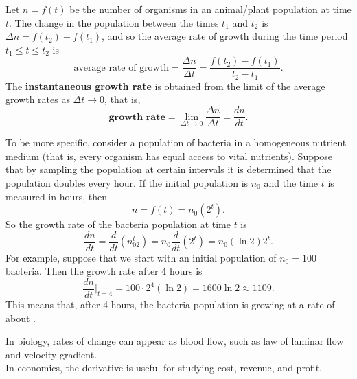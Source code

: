 \documentclass{book}
\begin{document}
\begin{Exam}\label{exam:bacteriagrowth} Let $n = f(t)$ be the number of organisms in an animal/plant population at time $t$. The change in the population between the times $t_1$ and $t_2$ is $\Delta n = f(t_2) - f(t_1)$, and so the average rate of growth during the time period $t_1\le t\le t_2$ is \[\text{average rate of growth} = \dfrac{\Delta n}{\Delta t} = \dfrac{f(t_2) -f(t_1)}{t_2-t_1}.\] The \textbf{instantaneous growth rate} is obtained from the limit of the average growth rates as $\Delta t \to 0$, that is, 
\[\textbf{growth rate} = \lim_{\Delta t \to 0}\dfrac{\Delta n}{\Delta t} = \dfrac{dn}{dt}.\]\vs

To be more specific, consider a population of bacteria in a homogeneous nutrient medium (that is, every organism has equal access to vital nutrients). Suppose that by sampling the population at certain intervals it is determined that the population doubles every hour. If the initial population is $n_0$ and the time $t$ is measured in hours, then \[n = f(t) = n_0(2^t).\] So the growth rate of the bacteria population at time $t$ is 
\[\dfrac{dn}{dt} = \dfrac{d}{dt}(n_02^t) = n_0\dfrac{d}{dt}(2^t) = n_0(\ln 2)2^t.\] For example, suppose that we start with an initial population of $n_0 = 100$ bacteria. Then the growth rate after 4 hours is \[\dfrac{dn}{dt}\bigg\vert_{t=4} = 100\cdot 2^4(\ln 2) = 1600\ln 2 \approx 1109.\] This means that, after 4 hours, the bacteria population is growing at a rate of about . 
\end{Exam}\vs

In biology, rates of change can appear as blood flow, such as law of laminar flow and velocity gradient.\\

In economics, the derivative is useful for studying cost, revenue, and profit.\\
\end{document}
